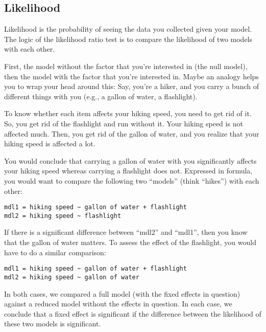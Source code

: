 \documentclass[residuals.tex]{subfiles}
\begin{document}
	
\newpage
\subsection{Likelihood}	
	
Likelihood is the probability of seeing the data you collected given your model. 
The logic of the likelihood ratio test is to compare the likelihood of two models 
with each other. 


First, the model without the factor that you’re interested in (the 
null model), then the model with the factor that you’re interested in. Maybe an 
analogy helps you to wrap your head around this: Say, you’re a hiker, and you 
carry a bunch of different things with you (e.g., a gallon of water, a flashlight). 


To know whether each item affects your hiking speed, you need to get rid of it. So, 
you get rid of the flashlight and run without it. Your hiking speed is not affected 
much. Then, you get rid of the gallon of water, and you realize that your hiking 
speed is affected a lot. 

You would conclude that carrying a gallon of water with 
you significantly affects your hiking speed whereas carrying a flashlight does not.
Expressed in formula, you would want to compare the following two “models” 
(think “hikes”) with each other:


\begin{verbatim}
mdl1 = hiking speed ~ gallon of water + flashlight
mdl2 = hiking speed ~ flashlight
\end{verbatim}
If there is a significant difference between “mdl2” and “mdl1”, then you know 
that the gallon of water matters. To assess the effect of the flashlight, you would 
have to do a similar comparison:
\begin{verbatim}
mdl1 = hiking speed ~ gallon of water + flashlight
mdl2 = hiking speed ~ gallon of water
\end{verbatim}
In both cases, we compared a full model (with the fixed effects in question) 
against a reduced model without the effects in question. In each case, we conclude 
that a fixed effect is significant if the difference between the likelihood of these 
two models is significant. 

\end{document}
